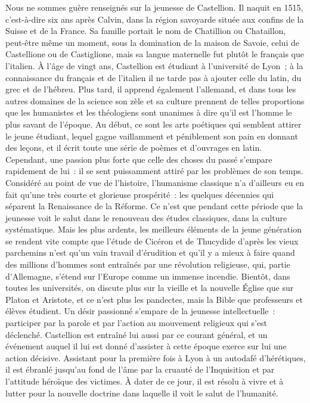 \documentclass[french,twoside]{book} %
\begin{document}
Nous ne sommes guère renseignés sur la jeunesse de Castellion. Il naquit en 1515, c’est-à-dire six ans après Calvin, dans la région savoyarde située aux confins de la Suisse et de la France. Sa famille portait le nom de Chatillion ou Chataillon, peut-être même un moment, sous la domination de la maison de Savoie, celui de Castellione ou de Castiglione, mais sa langue maternelle fut plutôt le français que l’italien. À l’âge de vingt ans, Castellion est étudiant à l’université de Lyon ; à la connaissance du français et de l’italien il ne tarde pas à ajouter celle du latin, du grec et de l’hébreu. Plus tard, il apprend également l’allemand, et dans tous les autres domaines de la science son zèle et sa culture prennent de telles proportions que les humanistes et les théologiens sont unanimes à dire qu’il est l’homme le plus savant de l’époque. Au début, ce sont les arts poétiques qui semblent attirer le jeune étudiant, lequel gagne vaillamment et péniblement son pain en donnant des leçons, et il écrit toute une série de poèmes et d’ouvrages en latin. Cependant, une passion plus forte que celle des choses du passé s’empare rapidement de lui : il se sent puissamment attiré par les problèmes de son temps. Considéré au point de vue de l’histoire, l’humanisme classique n’a d’ailleurs eu en fait qu’une très courte et glorieuse prospérité : les quelques décennies qui séparent la Renaissance de la Réforme. Ce n’est que pendant cette période que la jeunesse voit le salut dans le renouveau des études classiques, dans la culture systématique. Mais les plus ardents, les meilleurs éléments de la jeune génération se rendent vite compte que l’étude de Cicéron et de Thucydide d’après les vieux parchemins n’est qu’un vain travail d’érudition et qu’il y a mieux à faire quand des millions d’hommes sont entraînés par une révolution religieuse, qui, partie d’Allemagne, s’étend sur l’Europe comme un immense incendie. Bientôt, dans toutes les universités, on discute plus sur la vieille et la nouvelle Église que sur Platon et Aristote, et ce n’est plus les pandectes, mais la Bible que professeurs et élèves étudient. Un désir passionné s’empare de la jeunesse intellectuelle : participer par la parole et par l’action au mouvement religieux qui s’est déclenché. Castellion est entraîné lui aussi par ce courant général, et un événement auquel il lui est donné d’assister à cette époque exerce sur lui une action décisive. Assistant pour la première fois à Lyon à un autodafé d’hérétiques, il est ébranlé jusqu’au fond de l’âme par la cruauté de l’Inquisition et par l’attitude héroïque des victimes. À dater de ce jour, il est résolu à vivre et à lutter pour la nouvelle doctrine dans laquelle il voit le salut de l’humanité.\par
\end{document}
